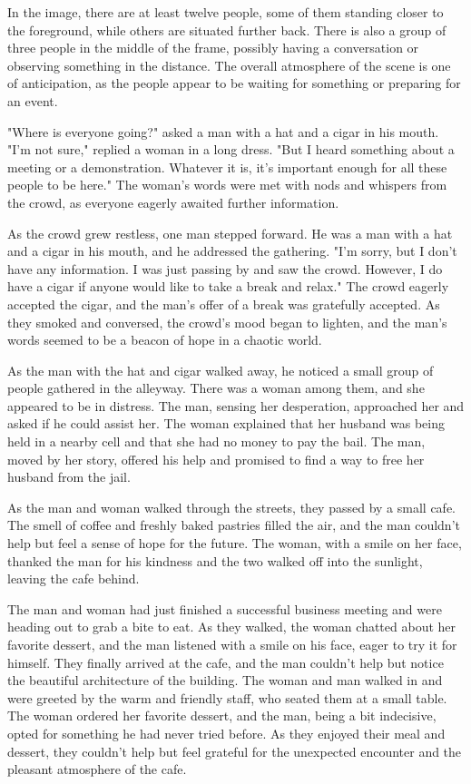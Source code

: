 \documentclass[smalldemyvopaper,11pt,twoside,onecolumn,openright,extrafontsizes]{memoir}
\begin{document}
In the image, there are at least twelve people, some of them standing closer to the foreground, while others are situated further back. There is also a group of three people in the middle of the frame, possibly having a conversation or observing something in the distance. The overall atmosphere of the scene is one of anticipation, as the people appear to be waiting for something or preparing for an event.\par
"Where is everyone going?" asked a man with a hat and a cigar in his mouth. "I'm not sure," replied a woman in a long dress. "But I heard something about a meeting or a demonstration. Whatever it is, it's important enough for all these people to be here." The woman's words were met with nods and whispers from the crowd, as everyone eagerly awaited further information.\par
As the crowd grew restless, one man stepped forward. He was a man with a hat and a cigar in his mouth, and he addressed the gathering. "I'm sorry, but I don't have any information. I was just passing by and saw the crowd. However, I do have a cigar if anyone would like to take a break and relax." The crowd eagerly accepted the cigar, and the man's offer of a break was gratefully accepted. As they smoked and conversed, the crowd's mood began to lighten, and the man's words seemed to be a beacon of hope in a chaotic world.\par
As the man with the hat and cigar walked away, he noticed a small group of people gathered in the alleyway. There was a woman among them, and she appeared to be in distress. The man, sensing her desperation, approached her and asked if he could assist her. The woman explained that her husband was being held in a nearby cell and that she had no money to pay the bail. The man, moved by her story, offered his help and promised to find a way to free her husband from the jail.\par
As the man and woman walked through the streets, they passed by a small cafe. The smell of coffee and freshly baked pastries filled the air, and the man couldn't help but feel a sense of hope for the future. The woman, with a smile on her face, thanked the man for his kindness and the two walked off into the sunlight, leaving the cafe behind.\par
The man and woman had just finished a successful business meeting and were heading out to grab a bite to eat. As they walked, the woman chatted about her favorite dessert, and the man listened with a smile on his face, eager to try it for himself. They finally arrived at the cafe, and the man couldn't help but notice the beautiful architecture of the building. The woman and man walked in and were greeted by the warm and friendly staff, who seated them at a small table. The woman ordered her favorite dessert, and the man, being a bit indecisive, opted for something he had never tried before. As they enjoyed their meal and dessert, they couldn't help but feel grateful for the unexpected encounter and the pleasant atmosphere of the cafe.\par
\end{document}
